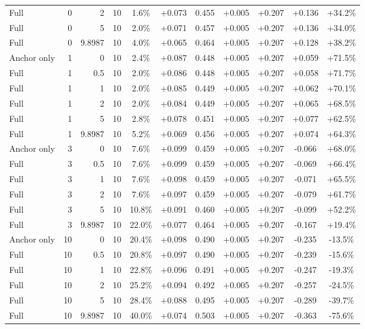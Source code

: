 \begin{table}[htbp]
\begin{tabular}{lrrrccccccc}
Full & 0 & 2 & 10 & 1.6\% & +0.073 & 0.455 & +0.005 & +0.207 & +0.136 & +34.2\% \\
Full & 0 & 5 & 10 & 2.0\% & +0.071 & 0.457 & +0.005 & +0.207 & +0.136 & +34.0\% \\
Full & 0 & 9.8987 & 10 & 4.0\% & +0.065 & 0.464 & +0.005 & +0.207 & +0.128 & +38.2\% \\
Anchor only & 1 & 0 & 10 & 2.4\% & +0.087 & 0.448 & +0.005 & +0.207 & +0.059 & +71.5\% \\
Full & 1 & 0.5 & 10 & 2.0\% & +0.086 & 0.448 & +0.005 & +0.207 & +0.058 & +71.7\% \\
Full & 1 & 1 & 10 & 2.0\% & +0.085 & 0.449 & +0.005 & +0.207 & +0.062 & +70.1\% \\
Full & 1 & 2 & 10 & 2.0\% & +0.084 & 0.449 & +0.005 & +0.207 & +0.065 & +68.5\% \\
Full & 1 & 5 & 10 & 2.8\% & +0.078 & 0.451 & +0.005 & +0.207 & +0.077 & +62.5\% \\
Full & 1 & 9.8987 & 10 & 5.2\% & +0.069 & 0.456 & +0.005 & +0.207 & +0.074 & +64.3\% \\
Anchor only & 3 & 0 & 10 & 7.6\% & +0.099 & 0.459 & +0.005 & +0.207 & -0.066 & +68.0\% \\
Full & 3 & 0.5 & 10 & 7.6\% & +0.099 & 0.459 & +0.005 & +0.207 & -0.069 & +66.4\% \\
Full & 3 & 1 & 10 & 7.6\% & +0.098 & 0.459 & +0.005 & +0.207 & -0.071 & +65.5\% \\
Full & 3 & 2 & 10 & 7.6\% & +0.097 & 0.459 & +0.005 & +0.207 & -0.079 & +61.7\% \\
Full & 3 & 5 & 10 & 10.8\% & +0.091 & 0.460 & +0.005 & +0.207 & -0.099 & +52.2\% \\
Full & 3 & 9.8987 & 10 & 22.0\% & +0.077 & 0.464 & +0.005 & +0.207 & -0.167 & +19.4\% \\
Anchor only & 10 & 0 & 10 & 20.4\% & +0.098 & 0.490 & +0.005 & +0.207 & -0.235 & -13.5\% \\
Full & 10 & 0.5 & 10 & 20.8\% & +0.097 & 0.490 & +0.005 & +0.207 & -0.239 & -15.6\% \\
Full & 10 & 1 & 10 & 22.8\% & +0.096 & 0.491 & +0.005 & +0.207 & -0.247 & -19.3\% \\
Full & 10 & 2 & 10 & 25.2\% & +0.094 & 0.492 & +0.005 & +0.207 & -0.257 & -24.5\% \\
Full & 10 & 5 & 10 & 28.4\% & +0.088 & 0.495 & +0.005 & +0.207 & -0.289 & -39.7\% \\
Full & 10 & 9.8987 & 10 & 40.0\% & +0.074 & 0.503 & +0.005 & +0.207 & -0.363 & -75.6\% \\

\end{tabular}
\end{table}

